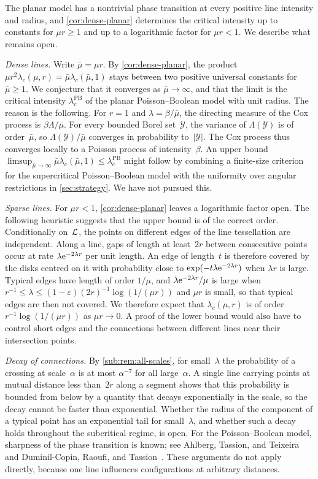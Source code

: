 \documentclass[11pt,letterpaper]{article}
\begin{document}
The planar model has a nontrivial phase transition at every positive line intensity and radius, and \cref{cor:dense-planar} determines the critical intensity up to constants for $\mu r\ge1$ and up to a logarithmic factor for $\mu r<1$. We describe what remains open.

\emph{Dense lines.} Write $\bar\mu=\mu r$. By \cref{cor:dense-planar}, the product $\mu r^2\lambda_c(\mu,r)=\bar\mu\lambda_c(\bar\mu,1)$ stays between two positive universal constants for $\bar\mu\ge1$. We conjecture that it converges as $\bar\mu\to\infty$, and that the limit is the critical intensity $\lambda_c^{\mathrm{PB}}$ of the planar Poisson--Boolean model with unit radius. The reason is the following. For $r=1$ and $\lambda=\beta/\bar\mu$, the directing measure of the Cox process is $\beta\Lambda/\bar\mu$. For every bounded Borel set~$\mathcal Y$, the variance of $\Lambda(\mathcal Y)$ is of order~$\bar\mu$, so $\Lambda(\mathcal Y)/\bar\mu$ converges in probability to~$\lvert\mathcal Y\rvert$. The Cox process thus converges locally to a Poisson process of intensity~$\beta$. An upper bound $\limsup_{\bar\mu\to\infty}\bar\mu\lambda_c(\bar\mu,1)\le\lambda_c^{\mathrm{PB}}$ might follow by combining a finite-size criterion for the supercritical Poisson--Boolean model with the uniformity over angular restrictions in \cref{sec:strategy}. We have not pursued this.

\emph{Sparse lines.} For $\mu r<1$, \cref{cor:dense-planar} leaves a logarithmic factor open. The following heuristic suggests that the upper bound is of the correct order. Conditionally on~$\mathcal L$, the points on different edges of the line tessellation are independent. Along a line, gaps of length at least~$2r$ between consecutive points occur at rate $\lambda\mathrm{e}^{-2\lambda r}$ per unit length. An edge of length~$t$ is therefore covered by the disks centred on it with probability close to $\exp(-t\lambda\mathrm{e}^{-2\lambda r})$ when $\lambda r$ is large. Typical edges have length of order $1/\mu$, and $\lambda\mathrm{e}^{-2\lambda r}/\mu$ is large when $r^{-1}\le\lambda\le(1-\varepsilon)(2r)^{-1}\log(1/(\mu r))$ and $\mu r$ is small, so that typical edges are then not covered. We therefore expect that $\lambda_c(\mu,r)$ is of order $r^{-1}\log(1/(\mu r))$ as $\mu r\to0$. A proof of the lower bound would also have to control short edges and the connections between different lines near their intersection points.

\emph{Decay of connections.} By \cref{sub:rem:all-scales}, for small~$\lambda$ the probability of a crossing at scale~$\alpha$ is at most $\alpha^{-7}$ for all large~$\alpha$. A single line carrying points at mutual distance less than~$2r$ along a segment shows that this probability is bounded from below by a quantity that decays exponentially in the scale, so the decay cannot be faster than exponential. Whether the radius of the component of a typical point has an exponential tail for small~$\lambda$, and whether such a decay holds throughout the subcritical regime, is open. For the Poisson--Boolean model, sharpness of the phase transition is known; see Ahlberg, Tassion, and Teixeira~\cite{ATT18} and Duminil-Copin, Raoufi, and Tassion~\cite{DRT20}. These arguments do not apply directly, because one line influences configurations at arbitrary distances.
\end{document}
